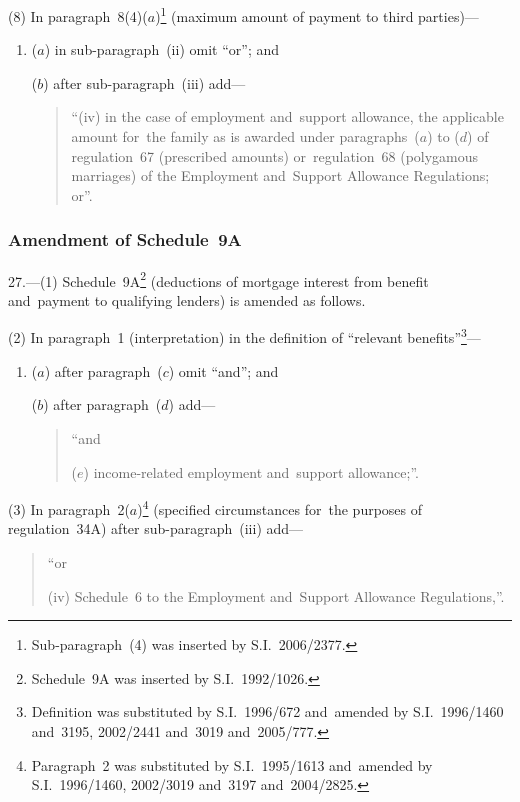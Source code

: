 \documentclass[12pt,a4paper]{article}
\begin{document}
(8) In paragraph~8(4)($a$)\footnote{Sub-paragraph~(4) was inserted by S.I.~2006/2377.} (maximum amount of payment to third parties)—
\begin{enumerate}\item[]
($a$) in sub-paragraph~(ii)  omit “or”; and

($b$) after sub-paragraph~(iii)  add—
\begin{quotation}
“(iv) in the case of employment and~support allowance, the applicable amount for~the family as is awarded under paragraphs~($a$)  to ($d$)  of regulation~67 (prescribed amounts) or~regulation~68 (polygamous marriages) of the Employment and~Support Allowance Regulations; or”.
\end{quotation}
\end{enumerate}

\subsubsection[27. Amendment of Schedule~9A]{Amendment of Schedule~9A}

27.---(1)  Schedule~9A\footnote{Schedule~9A was inserted by S.I.~1992/1026.} (deductions of mortgage interest from benefit and~payment to qualifying lenders) is amended as follows.

(2) In paragraph~1 (interpretation) in the definition of “relevant benefits”\footnote{Definition was substituted by S.I.~1996/672 and~amended by S.I.~1996/1460 and~3195, 2002/2441 and~3019 and~2005/777.}—
\begin{enumerate}\item[]
($a$) after paragraph~($c$)  omit “and”; and

($b$) after paragraph~($d$)  add—
\begin{quotation}
“and

($e$) income-related employment and~support allowance;”.
\end{quotation}
\end{enumerate}

(3) In paragraph~2($a$)\footnote{Paragraph~2 was substituted by S.I.~1995/1613 and~amended by S.I.~1996/1460, 2002/3019 and~3197 and~2004/2825.} (specified circumstances for~the purposes of regulation~34A) after sub-paragraph~(iii)  add—
\begin{quotation}
“or

(iv) Schedule~6 to the Employment and~Support Allowance Regulations,”.
\end{quotation}
\end{document}
